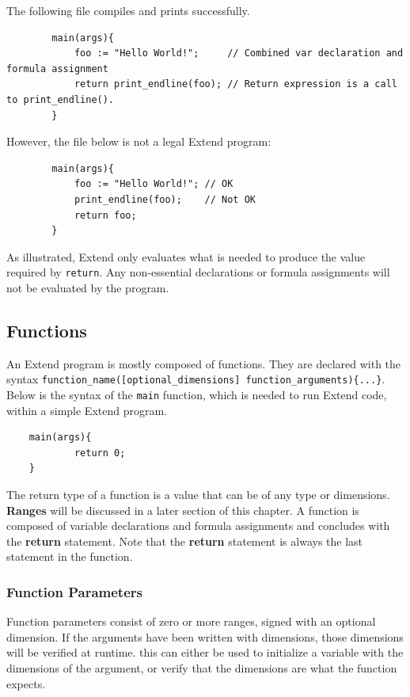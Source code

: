 	\medskip \noindent The following file compiles and prints successfully.

	\begin{lstlisting}
		main(args){
			foo := "Hello World!";     // Combined var declaration and formula assignment
			return print_endline(foo); // Return expression is a call to print_endline().
		}
	\end{lstlisting}

	\medskip \noindent However, the file below is not a legal Extend program:

	\begin{lstlisting}
		main(args){
			foo := "Hello World!"; // OK
			print_endline(foo);    // Not OK
			return foo;
		}
	\end{lstlisting}

	\medskip \noindent As illustrated, Extend only evaluates what is needed to produce the value required by \texttt{return}. Any non-essential declarations or formula assignments will not be evaluated by the program.

	\subsection{Functions}
	An Extend program is mostly composed of functions. They are declared with the syntax \texttt{function\_name([optional\_dimensions] function\_arguments)\{...\}}. Below is the syntax of the \texttt{main} function, which is needed to run Extend code, within a simple Extend program.

	\begin{lstlisting}
	main(args){
			return 0;
	}
	\end{lstlisting}

	\medskip \noindent
 	The return type of a function is a value that can be of any type or dimensions. \textbf{Ranges} will be discussed in a later section of this chapter. A function is composed of variable declarations and formula assignments and concludes with the \textbf{return} statement.
	Note that the \textbf{return} statement is always the last statement in the function.

		\subsubsection{Function Parameters}
		Function parameters consist of zero or more ranges, signed with an optional dimension. If the arguments have been written with dimensions, those dimensions will be verified at runtime. this can either be used to initialize a variable with the dimensions of the argument, or verify that the dimensions are what the function expects.

